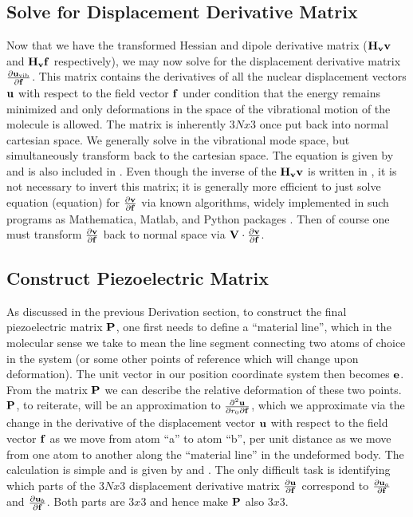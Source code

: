\subsection{Solve for Displacement Derivative Matrix}

Now that we have the transformed Hessian and dipole derivative matrix (${\bf{H_vv}}$ and ${\bf{H_vf}}$ respectively), we may now solve for the displacement derivative matrix 
${\frac{\partial {\ensuremath{\bf{u}}}_{\mathrm{vib}}}{\partial {\ensuremath{\bf{f}}}}}$.  
This matrix contains the derivatives of all the nuclear displacement vectors ${\bf{u}}$ with respect to the field vector ${\bf{f}}$ under condition
that the energy remains minimized and only deformations in the space of the vibrational motion of the molecule is allowed.  
The matrix is inherently $3Nx3$ once put back into normal cartesian space.  
We generally solve in the vibrational mode space, but simultaneously 
transform back to the cartesian space.  
The equation is given by  and is also included in .  
Even though the inverse of the ${\bf{H_vv}}$ is written in , 
it is not necessary to invert this matrix; it is generally more efficient to just solve equation (equation) for $\frac{\partial {\bf{v}}}{\partial {\bf{f}}}$ via known algorithms, widely implemented in such programs as Mathematica, Matlab, and Python
packages \cite{math,MATLAB:2010,python}.  
Then of course one must transform $\frac{\partial {\bf{v}}}{\partial {\bf{f}}}$ back to normal space via ${\bf{V}}\cdot \frac{\partial {\bf{v}}}{\partial {\bf{f}}}$.

\subsection{Construct Piezoelectric Matrix}

As discussed in the previous Derivation section, to construct the final piezoelectric matrix ${\bf{P}}$, one first needs to define a ``material line'', 
which in the molecular sense we 
take to mean the line segment connecting two atoms of choice in the system (or some other points of reference which will change upon deformation).  
The unit vector in our position coordinate
system then becomes ${\bf{e}}$.  
From the matrix ${\bf{P}}$ we can describe the relative deformation of these two points.  
${\bf{P}}$, to reiterate, will be an approximation to
$\frac{\partial^2 {\bf{u}}}{\partial r_0 \partial {\bf{f}}}$, which we approximate via the change in the derivative of the displacement 
vector ${\bf{u}}$ with respect to the field vector
${\bf{f}}$ as we move from atom ``a'' to atom ``b'', per unit distance as we move from one atom to another along the ``material line'' in the undeformed body.
The calculation is simple and is given by
 and .  
The only difficult task is identifying which parts of the $3Nx3$ displacement derivative matrix $\frac{\partial {\bf{u}}}{\partial {\bf{f}}}$ correspond to 
$\frac{\partial {\bf{u}}_a}{\partial {\bf{f}}}$ and $\frac{\partial {\bf{u}}_b}{\partial {\bf{f}}}$.  
Both parts are $3x3$ and hence make ${\bf{P}}$ also $3x3$.  

